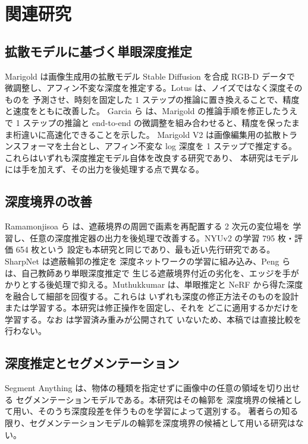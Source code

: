 \documentclass[conference]{IEEEtran}
\begin{document}
\section{関連研究}

\subsection{拡散モデルに基づく単眼深度推定}

Marigold \cite{marigold} は画像生成用の拡散モデル Stable Diffusion を合成 RGB-D データで
微調整し、アフィン不変な深度を推定する。Lotus \cite{lotus} は、ノイズではなく深度そのものを
予測させ、時刻を固定した 1 ステップの推論に置き換えることで、精度と速度をともに改善した。
Garcia ら \cite{onestep} は、Marigold の推論手順を修正したうえで 1 ステップの推論と
end-to-end の微調整を組み合わせると、精度を保ったまま桁違いに高速化できることを示した。
Marigold V2 \cite{marigoldv2} は画像編集用の拡散トランスフォーマを土台とし、アフィン不変な
log 深度を 1 ステップで推定する。これらはいずれも深度推定モデル自体を改良する研究であり、
本研究はモデルには手を加えず、その出力を後処理する点で異なる。

\subsection{深度境界の改善}

Ramamonjisoa ら \cite{ramamonjisoa} は、遮蔽境界の周囲で画素を再配置する 2 次元の変位場を
学習し、任意の深度推定器の出力を後処理で改善する。NYUv2 の学習 795 枚・評価 654 枚という
設定も本研究と同じであり、最も近い先行研究である。SharpNet \cite{sharpnet} は遮蔽輪郭の推定を
深度ネットワークの学習に組み込み、Peng ら \cite{edgeguided} は、自己教師あり単眼深度推定で
生じる遮蔽境界付近の劣化を、エッジを手がかりとする後処理で抑える。Muthukkumar
\cite{nerfrefine} は、単眼推定と NeRF から得た深度を融合して細部を回復する。これらは
いずれも深度の修正方法そのものを設計または学習する。本研究は修正操作を固定し、それを
どこに適用するかだけを学習する。なお \cite{ramamonjisoa} は学習済み重みが公開されて
いないため、本稿では直接比較を行わない。

\subsection{深度推定とセグメンテーション}

Segment Anything \cite{sam} は、物体の種類を指定せずに画像中の任意の領域を切り出せる
セグメンテーションモデルである。本研究はその輪郭を
深度境界の候補として用い、そのうち深度段差を伴うものを学習によって選別する。
著者らの知る限り、セグメンテーションモデルの輪郭を深度境界の候補として用いる研究はない。
\end{document}
